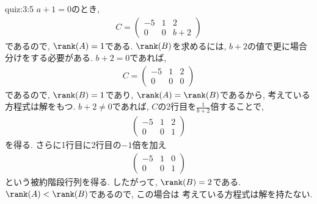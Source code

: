 \begin{answerof}{quiz:3:5}
  $a+1=0$のとき,
  \begin{align*}
    C=\begin{pmatrix}-5&1&2\\0&0&b+2\end{pmatrix}
  \end{align*}
  であるので, $\rank(A)=1$である.
  $\rank(B)$を求めるには, $b+2$の値で更に場合分けをする必要がある.
  $b+2=0$であれば,
  \begin{align*}
    C=\begin{pmatrix}-5&1&2\\0&0&0\end{pmatrix}
  \end{align*}
  であるので, $\rank(B)=1$であり, $\rank(A)=\rank(B)$であるから,
  考えている方程式は解をもつ.
  $b+2\neq 0$であれば,
  $C$の2行目を$\frac{1}{b+2}$倍することで,
  \begin{align*}
    \begin{pmatrix}-5&1&2\\0&0&1\end{pmatrix}
  \end{align*}
  を得る. さらに1行目に2行目の$-1$倍を加え
  \begin{align*}
    \begin{pmatrix}-5&1&0\\0&0&1\end{pmatrix}
  \end{align*}
  という被約階段行列を得る.
  したがって, $\rank(B)=2$である.
  $\rank(A)<\rank(B)$であるので,
  この場合は
  考えている方程式は解を持たない.
\end{answerof}

